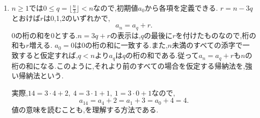 \noindent {}\par\nobreak
\begin{enumerate}[label=(\arabic*),parsep=3pt,beginpenalty=10000,format=\bookitemlink{example-gauss-role-8}{solution}{problem}]
  \item $n\ge1$では$0\le q=\lfloor\frac n3\rfloor<n$なので,初期値$a_0$から各項を定義できる.
    $r=n-3q$とおけば$r$は0,1,2のいずれかで,
    \[
      a_n=a_q+r.
    \]
    0の桁の和を0とする.$n=3q+r$の表示は,$q$の最後に$r$を付けたものなので,桁の和も$r$増える.
    $a_0=0$は0の桁の和に一致する.また,$n$未満のすべての添字で一致すると仮定すれば,$q<n$より$a_q$は$q$の桁の和である.従って$a_n=a_q+r$も$n$の桁の和になる.このように,それより前のすべての場合を仮定する帰納法を,強い帰納法という.

    実際,$14=3\cdot4+2,\ 4=3\cdot1+1,\ 1=3\cdot0+1$なので,
    \[
      a_{14}=a_4+2=a_1+3=a_0+4=4.
    \]
    値の意味を読むことも,を理解する方法である.
\end{enumerate}
